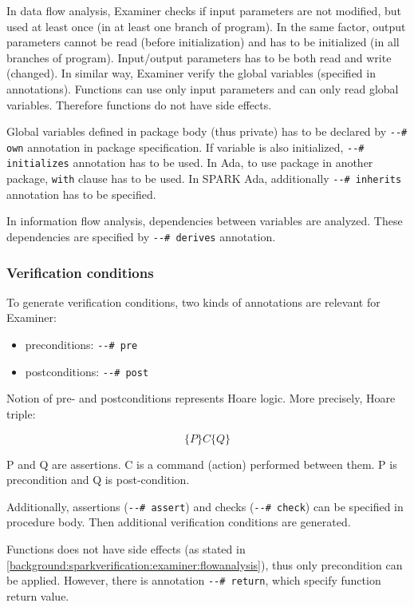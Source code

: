 In data flow analysis, Examiner checks if input parameters are not modified, but used at least once (in at least one branch of program). In the same factor, output parameters cannot be read (before initialization) and has to be initialized (in all branches of program). Input/output parameters has to be both read and write (changed). In similar way, Examiner verify the global variables (specified in annotations). Functions can use only input parameters and can only read global variables. Therefore functions do not have side effects. 

Global variables defined in package body (thus private) has to be declared by \lstinline{--# own} annotation in package specification. If variable is also initialized, \lstinline{--# initializes} annotation has to be used. In Ada, to use package in another package, \lstinline{with} clause has to be used. In SPARK Ada, additionally \lstinline{--# inherits} annotation has to be specified.

In information flow analysis, dependencies between variables are analyzed. These dependencies are specified by \lstinline{--# derives} annotation.


\subsubsection{Verification conditions}
\label{background:sparkverification:examiner:vc}

To generate verification conditions, two kinds of annotations are relevant for Examiner:
\begin{itemize}
	\item preconditions: \lstinline{--# pre}
	\item postconditions: \lstinline{--# post}
\end{itemize}

Notion of pre- and postconditions represents Hoare logic. More precisely, Hoare triple: 

\begin{equation} \label{eq:hoare_triple}
	\{P\} C \{Q\}
\end{equation}

P and Q are assertions. C is a command (action) performed between them. P is precondition and Q is post-condition.

Additionally, assertions (\lstinline{--# assert}) and checks (\lstinline{--# check}) can be specified in procedure body. Then additional verification conditions are generated.

Functions does not have side effects (as stated in \ref{background:sparkverification:examiner:flowanalysis}), thus only precondition can be applied. However, there is annotation \lstinline{--# return}, which specify function return value.

